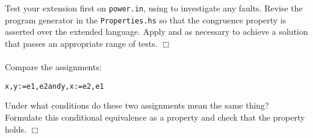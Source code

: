 Test your extension first on {\tt power.in}, using \Hat{} to
investigate any faults.
Revise the program generator in the {\tt Properties.hs} so that the congruence
property is asserted over the extended language.  Apply \QuickCheck{} and
\Hat{} as necessary to achieve a solution that passes an appropriate range
of tests.
\hfill$\Box$

\paragraph{\nextex}
Compare the assignments:
\begin{alltt}
x, y := e1, e2         and          y, x := e2, e1
\end{alltt}
Under what conditions do these two assignments mean the same thing?
Formulate this conditional equivalence
as a \QuickCheck{} property and check that the property holds.
\hfill$\Box$
